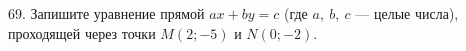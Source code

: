 69. Запишите уравнение прямой $ax+by=c$ (где $a,\ b,\ c$ --- целые числа), проходящей через точки $M(2;-5)$ и $N(0;-2).$\\
